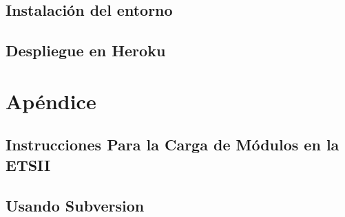\documentclass[11pt,a4paper,oneside,onecolumn]{book}
\begin{document}
\chapter{Instalación del entorno}
\label{chapter:ejecuciondeprogramas}


\chapter{Despliegue en Heroku}
\label{chapter:Despliegue en Heroku}




\part*{Apéndice}

\chapter*{Instrucciones Para la Carga de Módulos en la ETSII}
\label{apendice:modulosetsii}
 

\chapter*{Usando Subversion}
 
\end{document}
